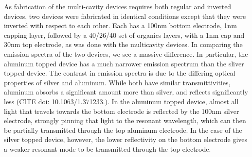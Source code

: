 \documentclass{report}
\begin{document}
            As fabrication of the multi-cavity devices requires both regular and inverted devices, two devices were fabricated in identical conditions except that they were inverted with respect to each other. Each has a 100nm bottom electrode, 1nm capping layer, followed by a 40/26/40 set of organics layers, with a 1nm cap and 30nm top electrode, as was done with the multicavity devices. In comparing the emission spectra of the two devices, we see a massive difference. In particular, the aluminum topped device has a much narrower emission spectrum than the sliver topped device. The contrast in emission spectra is due to the differing optical properties of silver and aluminum. While both have similar transmittivities, aluminum absorbs a significant amount more than silver, and reflects significantly less (CITE doi: 10.1063/1.371233.). In the aluminum topped device, almost all light that travels towards the bottom electrode is reflected by the 100nm silver electrode, strongly pinning that light to the resonant wavelength, which can then be partially transmitted through the top aluminum electrode. In the case of the silver topped device, however, the lower reflectivity on the bottom electrode gives a weaker resonant mode to be transmitted through the top electrode.
\end{document}
